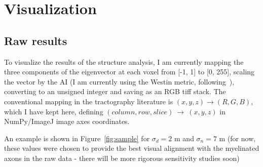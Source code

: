 \documentclass[11pt]{article}
\begin{document}
\section{Visualization}

\subsection{Raw results}

To visualize the results of the structure analysis, I am currently mapping the
three components of the eigenvector at each voxel from [-1, 1] to [0, 255],
scaling the vector by the AI (I am currently using the Westin metric,
following~\cite{Schilling2018}), converting to an unsigned integer and saving as
an RGB tiff stack. The conventional mapping in the tractography literature is
$(x, y, z)\rightarrow(R, G, B)$, which I have kept here, defining
\newline$(column, row, slice)~\rightarrow~(x,y,z)$ in NumPy/ImageJ image axes
coordinates.

An example is shown in Figure~\ref{fig:sample} for $\sigma_d = 2$ \textmu m and
$\sigma_n = 7$ \textmu m (for now, these values were chosen to provide the best
visual alignment with the myelinated axons in the raw data - there will be more
rigorous sensitivity studies soon)
\end{document}

